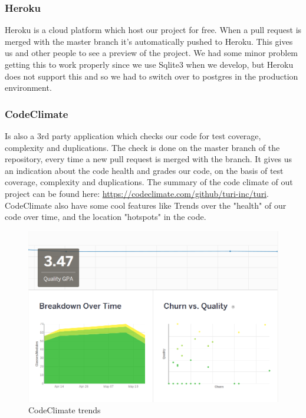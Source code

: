 \documentclass[a4paper]{article}
\begin{document}
\subsubsection{Heroku}
Heroku is a cloud platform which host our project for free. When a pull request is merged with the master branch it's automatically pushed to Heroku. This gives us and other people to see a preview of the project. We had some minor problem getting this to work properly since we use Sqlite3 when we develop, but Heroku does not support this and so we had to switch over to postgres in the production environment.

\subsubsection{CodeClimate}
Is also a 3rd party application which checks our code for test coverage, complexity and duplications. The check is done on the master branch of the repository, every time a new pull request is merged with the branch. It gives us an indication about the code health and grades our code, on the basis of test coverage, complexity and duplications. The summary of the code climate of out project can be found here: \url{https://codeclimate.com/github/turi-inc/turi}. \\
CodeClimate also have some cool features like Trends over the "health" of our code over time, and the location "hotspots" in the code.  

\begin{figure}
  \begin{center}
    \includegraphics[scale=0.45]{pictures/trends_code.png}
    \caption{CodeClimate trends}
    \label{fig:}
  \end{center}
\end{figure}
\end{document}
